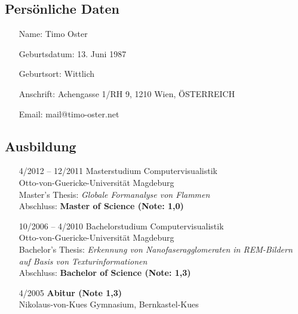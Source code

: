 \documentclass[oneside]{scrartcl}
\author{Timo Oster}
\date{26. April 2019}
\begin{document}
%
%
\subsection*{Persönliche Daten}
%
\begin{enumerate}
    \item[Name:] Timo Oster
    \item[Geburtsdatum:] 13. Juni 1987
    \item[Geburtsort:] Wittlich
    \item[Anschrift:] Achengasse 1/RH 9, 1210 Wien, ÖSTERREICH
    \item[Email:] mail@timo-oster.net
\end{enumerate}
%
\subsection*{Ausbildung}
%
\begin{enumerate}
    \item[4/2012 -- 12/2011] Masterstudium Computervisualistik\\
                   Otto-von-Guericke-Universität Magdeburg\\
                   Master's Thesis: \emph{Globale Formanalyse von Flammen}\\
                   Abschluss: \textbf{Master of Science (Note: 1,0)}
    \item[10/2006 -- 4/2010] Bachelorstudium Computervisualistik\\
                             Otto-von-Guericke-Universität Magdeburg\\
                             Bachelor's Thesis: \emph{Erkennung von Nanofaseragglomeraten in REM-Bildern auf Basis von Texturinformationen}\\
                             Abschluss: \textbf{Bachelor of Science (Note: 1,3)}
    \item[4/2005] \textbf{Abitur (Note 1,3)}\\
                  Nikolaus-von-Kues Gymnasium, Bernkastel-Kues
\end{enumerate}
%
\end{document}
